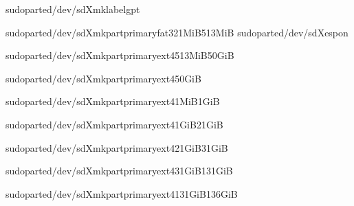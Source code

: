 \documentclass[letterpaper,10pt,english]{sphinxmanual}
\begin{document}
\begin{sphinxVerbatim}[commandchars=\\\{\}]
sudoparted/dev/sdXmklabelgpt

sudoparted/dev/sdXmkpartprimaryfat321MiB513MiB
sudoparted/dev/sdXespon

sudoparted/dev/sdXmkpartprimaryext4513MiB50GiB

sudoparted/dev/sdXmkpartprimaryext450GiB\PYGZpc{}
\end{sphinxVerbatim}

\sphinxAtStartPar
{}

\begin{sphinxVerbatim}[commandchars=\\\{\}]
sudoparted/dev/sdXmkpartprimaryext41MiB1GiB

sudoparted/dev/sdXmkpartprimaryext41GiB21GiB

sudoparted/dev/sdXmkpartprimaryext421GiB31GiB

sudoparted/dev/sdXmkpartprimaryext431GiB131GiB

sudoparted/dev/sdXmkpartprimaryext4131GiB136GiB
\end{sphinxVerbatim}

\sphinxAtStartPar
{}
\end{document}
